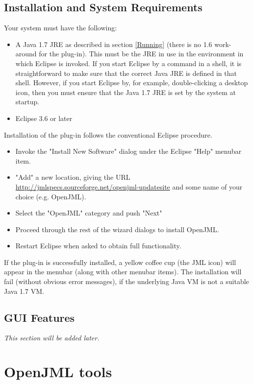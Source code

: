 \documentclass{report}%
\begin{document}
\section{Installation and System Requirements}
Your system must have the following:
\begin{itemize}
\item A Java 1.7 JRE as described in section \ref{Running} (there is no 1.6 work-around for the plug-in). This must be the JRE in use in the environment in which Eclipse is invoked. If you start Eclipse by a command in a shell, it is straightforward to make sure that the correct Java JRE is defined in that shell.  However, if you start Eclipse by, for example, double-clicking a desktop icon, then you must ensure that the Java 1.7 JRE is set by the system at startup.
\item Eclipse 3.6 or later
\end{itemize}

Installation of the plug-in follows the conventional Eclipse procedure.
\begin{itemize}
\item Invoke the "Install New Software" dialog under the Eclipse "Help" menubar item.
\item "Add" a new location, giving the URL \url{http://jmlspecs.sourceforge.net/openjml-updatesite} and some name of your choice (e.g. OpenJML).
\item Select the "OpenJML" category and push "Next"
\item Proceed through the rest of the wizard dialogs to install OpenJML.
\item Restart Eclipse when asked to obtain full functionality.
\end{itemize}

If the plug-in is successfully installed, a yellow coffee cup (the JML icon) will appear in the menubar (along with other menubar items).
The installation will fail (without obvious error messages), if the underlying Java VM is not a suitable Java 1.7 VM.

\section{GUI Features}

\textit{This section will be added later.} %


\chapter{OpenJML tools}
\end{document}
